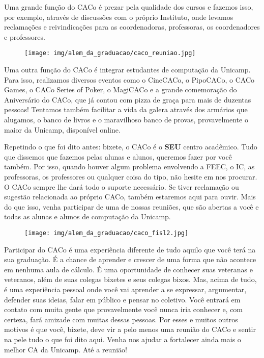 Uma grande função do CACo é prezar pela qualidade dos cursos e fazemos isso,
por exemplo, através de discussões com o próprio Instituto, onde levamos
reclamações e reivindicações para as coordenadoras, professoras, os
coordenadores e professores.

\begin{figure}[H]
  \centering
  \texttt{[image: img/alem\_da\_graduacao/caco\_reuniao.jpg]}
\end{figure}

Uma outra função do CACo é integrar estudantes de computação da Unicamp. Para
isso, realizamos diversos eventos como o CineCACo, o PipoCACo, o CACo Games, o
CACo Series of Poker, o MagiCACo e a grande comemoração do Aniversário do CACo,
que já contou com pizza de graça para mais de duzentas pessoas! Tentamos também
facilitar a vida da galera através dos armários que alugamos, o banco de livros
e o maravilhoso banco de provas, provavelmente o maior da Unicamp, disponível
online.

Repetindo o que foi dito antes: bixete, o CACo é o \textbf{SEU} centro
acadêmico. Tudo que dissemos que fazemos pelas alunas e alunos, queremos fazer
por você também. Por isso, quando houver algum problema envolvendo a FEEC, o
IC, as professoras, os professores ou qualquer coisa do tipo, não hesite em nos
procurar. O CACo sempre lhe dará todo o suporte necessário. Se tiver reclamação
ou sugestão relacionada ao próprio CACo, também estaremos aqui para ouvir. Mais
do que isso, venha participar de uma de nossas reuniões, que são abertas a você
e todas as alunas e alunos de computação da Unicamp.

\begin{figure}[H]
  \centering
  \texttt{[image: img/alem\_da\_graduacao/caco\_fisl2.jpg]}
\end{figure}

Participar do CACo é uma experiência diferente de tudo aquilo que você terá na
sua graduação. É a chance de aprender e crescer de uma forma que não acontece
em nenhuma aula de cálculo. É uma oportunidade de conhecer suas veteranas e
veteranos, além de suas colegas bixetes e seus colegas bixos. Mas, acima de
tudo, é uma experiência pessoal onde você vai aprender a se expressar,
argumentar, defender suas ideias, falar em público e pensar no coletivo. Você
entrará em contato com muita gente que provavelmente você nunca iria conhecer
e, com certeza, fará amizade com muitas dessas pessoas. Por esses e muitos
outros motivos é que você, bixete, deve vir a pelo menos uma reunião do CACo e
sentir na pele tudo o que foi dito aqui. Venha nos ajudar a fortalecer ainda
mais o melhor CA da Unicamp. Até a reunião!

